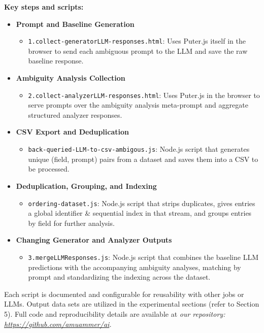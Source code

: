 \documentclass[11pt,a4paper]{article}
\begin{document}
\textbf{Key steps and scripts:}
\begin{itemize}
    \item \textbf{Prompt and Baseline Generation}
        \begin{itemize}
            \item \texttt{\lstinline!1.collect-generatorLLM-responses.html!}: Uses Puter.js itself in the browser to send each ambiguous prompt to the LLM and save the raw baseline response.
        \end{itemize}
    \item \textbf{Ambiguity Analysis Collection}
        \begin{itemize}
            \item \texttt{\lstinline!2.collect-analyzerLLM-responses.html!}: Uses Puter.js in the browser to serve prompts over the ambiguity analysis meta-prompt and aggregate structured analyzer responses.
        \end{itemize}
    \item \textbf{CSV Export and Deduplication}
        \begin{itemize}
            \item \texttt{\lstinline!back-queried-LLM-to-csv-ambigous.js!}: Node.js script that generates unique (field, prompt) pairs from a dataset and saves them into a CSV to be processed.
        \end{itemize}
    \item \textbf{Deduplication, Grouping, and Indexing}
        \begin{itemize}
            \item \texttt{\lstinline!ordering-dataset.js!}: Node.js script that strips duplicates, gives entries a global identifier \& sequential index in that stream, and groups entries by field for further analysis.
        \end{itemize}
    \item \textbf{Changing Generator and Analyzer Outputs}
        \begin{itemize}
            \item \texttt{\lstinline!3.mergeLLMResponses.js!}: Node.js script that combines the baseline LLM predictions with the accompanying ambiguity analyses, matching by prompt and standardizing the indexing across the dataset.
        \end{itemize}
\end{itemize}
Each script is documented and configurable for reusability with other jobs or LLMs. Output data sets are utilized in the experimental sections (refer to Section 5). Full code and reproducibility details are available at \textit{our repository\cite{amuammer2025promptframework}: \url{https://github.com/amuammer/ai}.}
\end{document}
